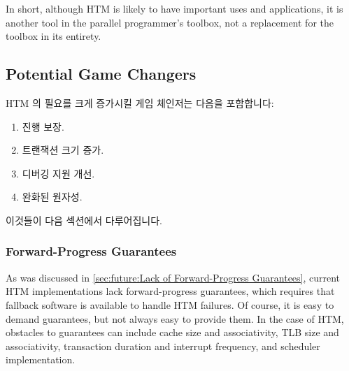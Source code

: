 In short, although HTM is likely to have important uses and applications,
it is another tool in the parallel programmer's toolbox, not a replacement
for the toolbox in its entirety.

\fi

\subsection{Potential Game Changers}
\label{sec:future:Potential Game Changers}

HTM 의 필요를 크게 증가시킬 게임 체인저는 다음을 포함합니다:

\begin{enumerate}
\item	진행 보장.
\item	트랜잭션 크기 증가.
\item	디버깅 지원 개선.
\item	완화된 원자성.
\end{enumerate}

이것들이 다음 섹션에서 다루어집니다.

\iffalse

Game changers that could greatly increase the need for HTM include
the following:

\begin{enumerate}
\item	Forward-progress guarantees.
\item	Transaction-size increases.
\item	Improved debugging support.
\item	Weak atomicity.
\end{enumerate}

These are expanded upon in the following sections.

\fi

\subsubsection{Forward-Progress Guarantees}
\label{sec:future:Forward-Progress Guarantees}

As was discussed in
\cref{sec:future:Lack of Forward-Progress Guarantees},
current HTM implementations lack forward-progress guarantees, which requires
that fallback software is available to handle HTM failures.
Of course, it is easy to demand guarantees, but not always easy
to provide them.
In the case of HTM, obstacles to guarantees can include cache size and
associativity, TLB size and associativity, transaction duration and
interrupt frequency, and scheduler implementation.

